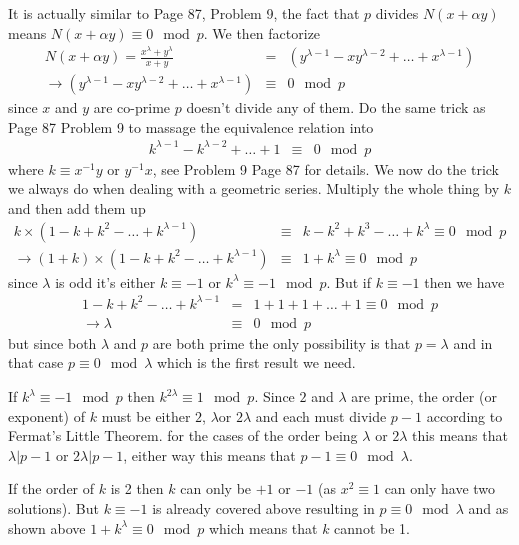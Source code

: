 \documentclass[aps,preprint,preprintnumbers,nofootinbib,showpacs,prd]{revtex4-1}
\newcommand{\nbea}{\begin{eqnarray*}}
\newcommand{\neea}{\end{eqnarray*}}
\begin{document}
It is actually similar to Page 87, Problem 9, the fact that $p$ divides $N(x + \alpha y)$ means $N(x + \alpha y) \equiv 0 \mod{p}$. We then factorize
%
\nbea
N(x + \alpha y) = \frac{x^\lambda + y^\lambda}{x + y} & = & (y^{\lambda-1} - xy^{\lambda - 2} + \dots + x^{\lambda-1}) \\
\to (y^{\lambda-1} - xy^{\lambda - 2} + \dots + x^{\lambda-1}) & \equiv & 0 \mod{p}
\neea
%
since $x$ and $y$ are co-prime $p$ doesn't divide any of them. Do the same trick as Page 87 Problem 9 to massage the equivalence relation into
%
\nbea
k^{\lambda-1} - k^{\lambda - 2} + \dots + 1 & \equiv & 0 \mod{p}
\neea
%
where $k \equiv x^{-1} y$ or $y^{-1} x$, see Problem 9 Page 87 for details. We now do the trick we always do when dealing with a geometric series. Multiply the whole thing by $k$ and then add them up
%
\nbea
k \times (1 - k + k^2 - \dots + k^{\lambda - 1}) & \equiv & k - k^2 + k^3 - \dots + k^{\lambda} \equiv 0 \mod{p} \\
\to (1 + k) \times (1 - k + k^2 - \dots + k^{\lambda - 1})  & \equiv & 1 + k^{\lambda} \equiv 0 \mod{p}
\neea
%
since $\lambda$ is odd it's either $k \equiv -1$ or $k^{\lambda} \equiv -1 \mod{p}$. But if $k \equiv -1$ then we have
%
\nbea
1 - k + k^2 - \dots + k^{\lambda - 1} & = & 1 + 1 + 1 + \dots + 1 \equiv 0 \mod{p} \\
\to \lambda & \equiv & 0 \mod{p}
\neea
%
but since both $\lambda$ and $p$ are both prime the only possibility is that $p = \lambda$ and in that case $p \equiv 0 \mod{\lambda}$ which is the first result we need.

If $k^{\lambda} \equiv -1 \mod{p}$ then $k^{2\lambda} \equiv 1 \mod{p}$. Since $2$ and $\lambda$ are prime, the order (or exponent) of $k$ must be either $2$, $\lambda$or $2\lambda$ and each must divide $p - 1$ according to Fermat's Little Theorem. for the cases of the order being $\lambda$ or $2\lambda$ this means that $\lambda|p-1$ or $2\lambda|p-1$, either way this means that $p - 1 \equiv 0 \mod{\lambda}$.

If the order of $k$ is 2 then $k$ can only be $+1$ or $-1$ (as $x^2 \equiv 1$ can only have two solutions). But $k \equiv -1$ is already covered above resulting in $p \equiv 0 \mod{\lambda}$ and as shown above $1 + k^\lambda \equiv 0 \mod{p}$ which means that $k$ cannot be 1.
\end{document}
